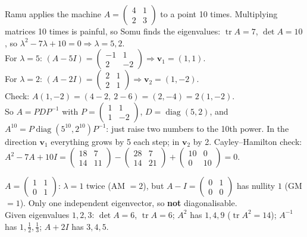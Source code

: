 \documentclass[11pt,a4paper]{article}
\newcommand{\tr}{\operatorname{tr}}
\newcommand{\diag}{\operatorname{diag}}
\begin{document}
\begin{story}
Ramu applies the machine $A=\begin{pmatrix}4&1\\2&3\end{pmatrix}$ to a point 10 times. Multiplying matrices 10 times is painful, so Somu finds the eigenvalues: $\tr A=7$, $\det A=10$, so $\lambda^2-7\lambda+10=0\Rightarrow\lambda=5,2$.\\
For $\lambda=5$: $(A-5I)=\begin{pmatrix}-1&1\\2&-2\end{pmatrix}\Rightarrow\mathbf v_1=(1,1)$.\\
For $\lambda=2$: $(A-2I)=\begin{pmatrix}2&1\\2&1\end{pmatrix}\Rightarrow\mathbf v_2=(1,-2)$.\\
Check: $A(1,-2)=(4-2,\ 2-6)=(2,-4)=2(1,-2)$. \checkmark\\
So $A=PDP^{-1}$ with $P=\begin{pmatrix}1&1\\1&-2\end{pmatrix}$, $D=\diag(5,2)$, and $A^{10}=P\diag(5^{10},2^{10})P^{-1}$: just raise two numbers to the 10th power. In the direction $\mathbf v_1$ everything grows by 5 each step; in $\mathbf v_2$ by 2. Cayley--Hamilton check: $A^2-7A+10I=\begin{pmatrix}18&7\\14&11\end{pmatrix}-\begin{pmatrix}28&7\\14&21\end{pmatrix}+\begin{pmatrix}10&0\\0&10\end{pmatrix}=0$.
\end{story}

\begin{example}
$A=\begin{pmatrix}1&1\\0&1\end{pmatrix}$: $\lambda=1$ twice (AM $=2$), but $A-I=\begin{pmatrix}0&1\\0&0\end{pmatrix}$ has nullity $1$ (GM $=1$). Only one independent eigenvector, so \textbf{not} diagonalisable.\\
Given eigenvalues $1,2,3$: $\det A=6$, $\tr A=6$; $A^2$ has $1,4,9$ ($\tr A^2=14$); $A^{-1}$ has $1,\frac12,\frac13$; $A+2I$ has $3,4,5$.
\end{example}
\end{document}
